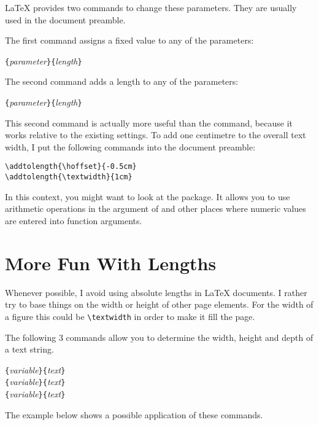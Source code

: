 \LaTeX{} provides two commands to change these parameters. They are
usually used in the document preamble.

The first command assigns a fixed value to any of the parameters:
\begin{lscommand}
\verb|{|\emph{parameter}\verb|}{|\emph{length}\verb|}|
\end{lscommand}

The second command adds a length to any of the parameters:
\begin{lscommand}
\verb|{|\emph{parameter}\verb|}{|\emph{length}\verb|}|
\end{lscommand} 

This second command is actually more useful than the 
command, because it works relative to the existing settings.
To add one centimetre to the overall text width, I put the
following commands into the document preamble:
\begin{code}
\verb|\addtolength{\hoffset}{-0.5cm}|\\
\verb|\addtolength{\textwidth}{1cm}|
\end{code}

In this context, you might want to look at the  package.
It allows you to use arithmetic operations in the argument of 
and other places where numeric values are entered into function
arguments.

\section{More Fun With Lengths}

Whenever possible, I avoid using absolute lengths in
\LaTeX{} documents. I rather try to base things on the width or height
of other page elements. For the width of a figure this could
be \verb|\textwidth| in order to make it fill the page.

The following 3 commands allow you to determine the width, height and
depth of a text string.

\begin{lscommand}
\verb|{|\emph{variable}\verb|}{|\emph{text}\verb|}|\\
\verb|{|\emph{variable}\verb|}{|\emph{text}\verb|}|\\
\verb|{|\emph{variable}\verb|}{|\emph{text}\verb|}|
\end{lscommand}

\noindent The example below shows a possible application of these commands.

